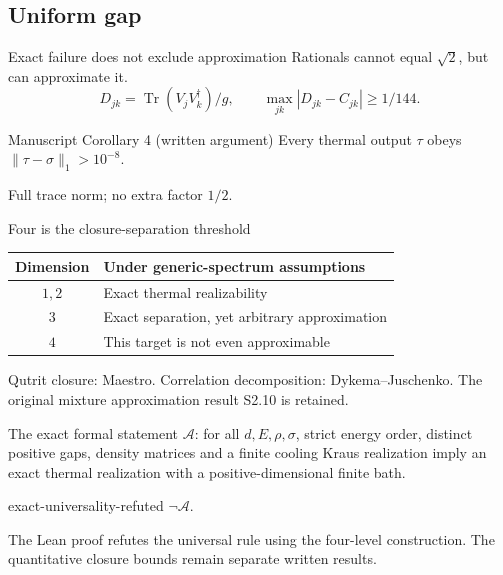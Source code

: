 \documentclass{beamer}
\begin{document}
\subsection{Uniform gap}
\begin{frame}{Exact failure does not exclude approximation}
Rationals cannot equal $\sqrt2$, but can approximate it.
 \[D_{jk}=\operatorname{Tr}(V_jV_k^\dagger)/g,\qquad
 \max_{jk}|D_{jk}-C_{jk}|\geq1/144.\]
 \begin{block}{Manuscript Corollary 4 (written argument)}
 Every thermal output $\tau$ obeys $\|\tau-\sigma\|_1>10^{-8}$.
 \end{block}
 Full trace norm; no extra factor $1/2$.
\end{frame}
\begin{frame}{Four is the closure-separation threshold}
\begin{tabular}{cl}
 Dimension & Under generic-spectrum assumptions\\\hline
 $1,2$ & Exact thermal realizability\\
 $3$ & Exact separation, yet arbitrary approximation\\
 $4$ & This target is not even approximable
 \end{tabular}
 \medskip

 Qutrit closure: Maestro. Correlation decomposition: Dykema--Juschenko.
 The original mixture approximation result S2.10 is retained.
\end{frame}
\begin{frame}{The exact formal statement}
$\mathcal A$: for all $d,E,\rho,\sigma$, strict energy order, distinct positive gaps, density matrices and a finite cooling Kraus realization imply an exact thermal realization with a positive-dimensional finite bath.
 \begin{bookresult}{exact-universality-refuted}
 $\neg\mathcal A$.
 \end{bookresult}
 The Lean proof refutes the universal rule using the four-level construction.
 The quantitative closure bounds remain separate written results.
\end{frame}
\end{document}
